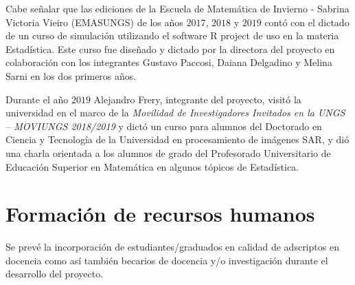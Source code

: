 \documentclass[11pt]{article}
\begin{document}
Cabe señalar que las ediciones de la Escuela de Matemática de Invierno - Sabrina Victoria Vieiro (EMASUNGS) de los años $2017$, $2018$ y $2019$ contó  con el dictado de un curso de simulación utilizando el software R project de uso en la materia Estadística. Este curso fue diseñado y dictado por la directora del proyecto en colaboración con los integrantes Gustavo Paccosi, Daiana Delgadino y Melina Sarni en los dos primeros años. 

Durante el año $2019$ Alejandro Frery, integrante del proyecto, visitó la universidad en el marco de la \textit{Movilidad de Investigadores Invitados en la UNGS – MOVIUNGS 2018/2019} y dictó un curso para alumnos del Doctorado en Ciencia y Tecnología de la Universidad en procesamiento de imágenes SAR, y dió una charla orientada a los alumnos de grado del  Profesorado Universitario de Educación Superior en Matemática en algunos tópicos de Estadística.  

\section{Formación de recursos humanos}

Se prevé la incorporación de estudiantes/graduados en calidad de adscriptos en docencia como así también becarios de docencia y/o investigación durante el desarrollo del proyecto.

%


\end{document}
